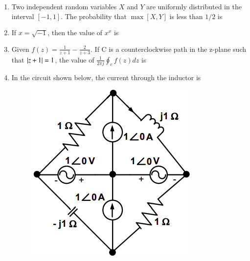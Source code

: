 \documentclass[journal,12pt,onecolumn]{IEEEtran}
\theoremstyle{remark}
\begin{document}
\begin{enumerate}[start=1, label=Q.\arabic*]

\item Two independent random variables $X$ and $Y$ are uniformly distributed in the interval $[-1,1]$. The probability that $\max[X, Y]$ is less than $1/2$ is

\begin{enumerate}
\end{enumerate}
\hfill{}

\item If $x=\sqrt{-1}$, then the value of $x^{x}$ is

\begin{enumerate}
\end{enumerate}
\hfill{}

\item Given $f(z)=\frac{1}{z+1}-\frac{2}{z+3}$. If C is a counterclockwise path in the z-plane such that $\left\vert z+1\right\vert=1$, the value of $\frac{1}{2\pi j}\oint_{c}f(z)dz$ is

\begin{enumerate}
\end{enumerate}
\hfill{}

\item In the circuit shown below, the current through the inductor is
\begin{figure}[H]
    \centering
    \includegraphics[width=0.4\columnwidth]{Figures/q4.png}
    \caption{}
\end{figure}


\end{enumerate}
\end{document}
